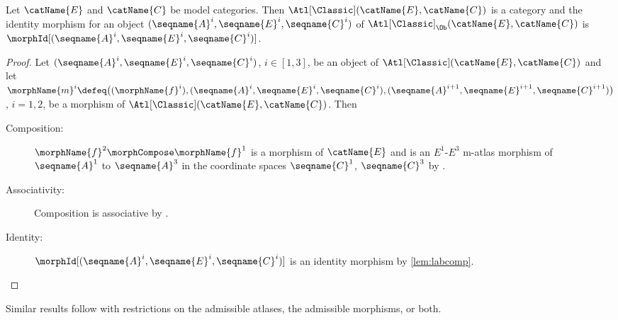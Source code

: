 \documentclass{article}
\begin{document}
\begin{lemma}
\label{lem:C-cat-ATLCiscat}
Let $\catName{E}$ and $\catName{C}$ be model categories. Then
$\Atl[\Classic](\catName{E}, \catName{C})$ is a category and the identity morphism
for an object $(\seqname{A}^i, \seqname{E}^i, \seqname{C}^i)$ of
$\Atl[\Classic]_\Ob(\catName{E}, \catName{C})$ is
$\morphId[{{(\seqname{A}^i, \seqname{E}^i, \seqname{C}^i)}}]$.

\begin{proof}
Let $(\seqname{A}^i,\seqname{E}^i,\seqname{C}^i)$, $i \in [1,3]$,
be an object of $\Atl[\Classic](\catName{E}, \catName{C})$ and
let \\
$
  \morphName{m}^i \defeq
  \bigl (
    (\morphName{f}^i),
    (\seqname{A}^i,\seqname{E}^i,\seqname{C}^i),
    (\seqname{A}^{i+1},\seqname{E}^{i+1},\seqname{C}^{i+1})
  \bigr )
$, $i=1,2$,
be a morphism of $\Atl[\Classic](\catName{E}, \catName{C})$. Then
\begin{description}
\item[Composition:]
$\morphName{f}^2 \morphCompose \morphName{f}^1$ is a morphism of $\catName{E}$ and
is an $E^1$-$E^3$ m-atlas morphism of $\seqname{A}^1$ to $\seqname{A}^3$
in the coordinate spaces $\seqname{C}^1$, $\seqname{C}^3$ by
.

\item[Associativity:]
Composition is associative by .

\item[Identity:]
$\morphId[{{(\seqname{A}^i, \seqname{E}^i, \seqname{C}^i)}}]$ is an identity
morphism by \cref{lem:labcomp}.
\end{description}
\end{proof}

Similar results follow with restrictions on the admissible atlases,
the admissible morphisms, or both.
\end{lemma}
\end{document}
